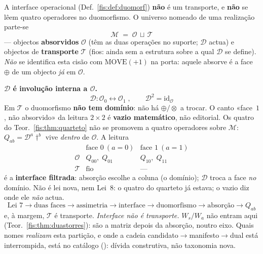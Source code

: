 \documentclass[livro.tex]{subfiles}
\begin{document}
\begin{definicao}\label{fis:def:dominio-interface}
A interface operacional (Def.~\ref{fis:def:duomorf}) \textbf{não} é um
transporte, e \textbf{não} se lêem quatro operadores no duomorfismo. O universo
nomeado de uma realização parte-se
\[
\boxed{\;\mathcal{M}\;=\;\mathcal{O}\,\sqcup\,\mathcal{T}\;}
\]
--- objectos \textbf{absorvidos} $\mathcal{O}$ (têm as duas operações no
suporte; $\mathcal{D}$ actua) e objectos de \textbf{transporte} $\mathcal{T}$
(fios: ainda sem a estrutura sobre a qual $\mathcal{D}$ se define).
\emph{Não} se identifica esta cisão com $\mathrm{MOVE}(+1)$ na porta: aquele
absorve é a face $\oplus$ de um objecto \emph{já} em $\mathcal{O}$.

\medskip\noindent\textbf{$\mathcal{D}$ é involução interna a $\mathcal{O}$.}
\[
\boxed{\;\mathcal{D}\colon\mathcal{O}_{0}\longleftrightarrow\mathcal{O}_{1}\;,\qquad
\mathcal{D}^{2}=\mathrm{id}_{\mathcal{O}}\;}
\]
Em $\mathcal{T}$ o duomorfismo \textbf{não tem domínio}: não há
$\oplus/\otimes$ a trocar. O canto «face~$1$, não absorvido» da leitura
$2{\times}2$ é \textbf{vazio matemático}, não editorial. Os quatro do
Teor.~\ref{fis:thm:quarteto} não se promovem a quatro operadores sobre
$\mathcal{M}$: $Q_{ab}=\mathcal{D}^{a}\dagger^{b}$ vive \emph{dentro} de
$\mathcal{O}$. A leitura
\[
\begin{array}{c|cc}
 & \text{face }0\ (a{=}0) & \text{face }1\ (a{=}1)\\\hline
\mathcal{O} & Q_{00},\;Q_{01} & Q_{10},\;Q_{11}\\[2pt]
\mathcal{T} & \text{fio} & \text{---}
\end{array}
\]
é a \textbf{interface filtrada}: absorção escolhe a coluna (o domínio);
$\mathcal{D}$ troca a face \emph{no} domínio. Não é lei nova, nem Lei~8: o
quatro do quarteto já estava; o vazio diz onde ele \emph{não} actua.
\[
\boxed{\;
\text{Lei~7}\to\text{duas faces}\to\text{assimetria}\to\text{interface}
\to\text{duomorfismo}\to\text{absorção}\to Q_{ab}
\;}
\]
e, à margem, $\mathcal{T}$ é transporte. \emph{Interface não é transporte.}
$W_s/W_a$ não entram aqui (Teor.~\ref{fis:thm:duastorres}): são a matriz
depois da absorção, noutro eixo. Quais nomes \emph{realizam} esta partição,
e onde a cadeia candidato$\to$manifesto$\to$dual está interrompida, está no
catálogo (): dívida construtiva, não taxonomia
nova.
\end{definicao}
\end{document}
